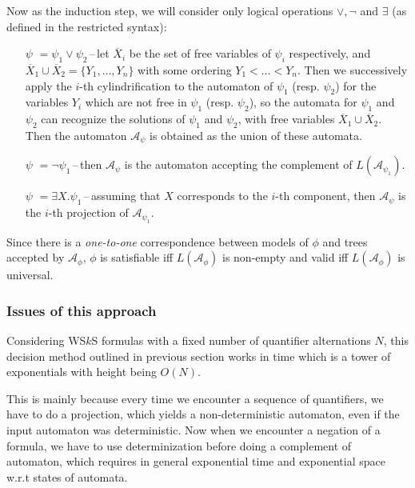Now as the induction step, we will consider only logical operations $\vee, \neg$ and $\exists$ (as defined in the restricted syntax):
\begin{itemize}
 \item[$\psi$]$ = \psi_1 \vee \psi_2$\,--\,let $\overline{X}_i$ be the set of free variables of $\psi_i$ respectively, and $\overline{X}_1 \cup \overline{X}_2 = \{Y_1,\ldots,Y_n\}$ with some ordering $Y_1 < \ldots < Y_n$. Then we successively apply the $i$-th cylindrification to the automaton of $\psi_1$ (resp. $\psi_2$) for the variables $Y_i$ which are not free in $\psi_1$ (resp. $\psi_2$), so the automata for $\psi_1$ and $\psi_2$ can recognize the solutions of $\psi_1$ and $\psi_2$, with free variables $\overline{X}_1 \cup \overline{X}_2$. Then the automaton $\mathcal{A}_\psi$ is obtained as the union of these automata.
 \item[$\psi$]$ = \neg\psi_1$\,--\,then $\mathcal{A}_\psi$ is the automaton accepting the complement of $L(\mathcal{A}_{\psi_1})$.
 \item[$\psi$]$ = \exists X.\psi_1$\,--\,assuming that $X$ corresponds to the $i$-th component, then $\mathcal{A}_\psi$ is the $i$-th projection of $\mathcal{A}_{\psi_1}$.
\end{itemize}

\begin{prop}
 Since there is a \emph{one-to-one} correspondence between models of $\phi$ and trees accepted by $\mathcal{A}_\phi$, $\phi$ is satisfiable iff $L(\mathcal{A}_\phi)$ is non-empty and valid iff $L(\mathcal{A}_\phi)$  is universal.
\end{prop}

\subsubsection{Issues of this approach}

Considering WS$k$S formulas with a fixed number of quantifier alternations $N$, this decision method outlined in previous section works in time which is a tower of exponentials with height being $O(N)$.

This is mainly because every time we encounter a sequence of quantifiers, we have to do a projection, which yields a non-deterministic automaton, even if the input automaton was deterministic. Now when we encounter a negation of a formula, we have to use determinization before doing a complement of automaton, which requires in general exponential time and exponential space w.r.t states of automata. 

